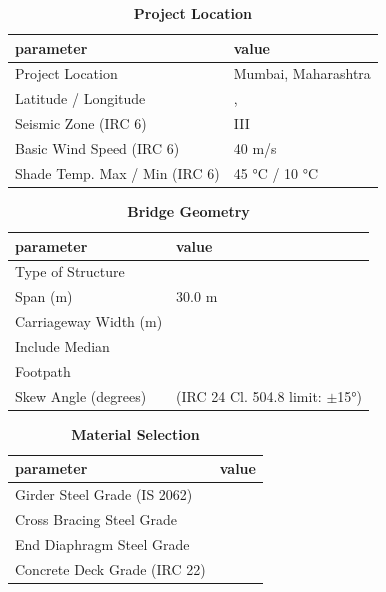 \documentclass[12pt,a4paper]{report}
\numberwithin{table}{chapter}
\numberwithin{figure}{chapter}
\begin{document}
\begin{table}[H]
\caption{\textbf{Project Location}}
\label{subsec:project-location}
\begin{tabular}{|L{5.5cm}|L{8.5cm}|}
\hline
\textbf{parameter} & \textbf{value} \\
\hline
\textnormal{Project Location} & Mumbai, Maharashtra \\
\hline
\textnormal{Latitude / Longitude} & ,  \\
\hline
\textnormal{Seismic Zone (IRC 6)} & III \\
\hline
\textnormal{Basic Wind Speed (IRC 6)} & 40 m/s \\
\hline
\textnormal{Shade Temp. Max / Min (IRC 6)} & 45 °C / 10 °C \\
\hline
\end{tabular}
\vspace{0.4cm}
\end{table}

\begin{table}[H]
\caption{\textbf{Bridge Geometry}}
\label{subsec:bridge-geometry}
\begin{tabular}{|L{5.5cm}|L{8.5cm}|}
\hline
\textbf{parameter} & \textbf{value} \\
\hline
\textnormal{Type of Structure} &  \\
\hline
\textnormal{Span (m)} & 30.0 m \\
\hline
\textnormal{Carriageway Width (m)} &  \\
\hline
\textnormal{Include Median} &  \\
\hline
\textnormal{Footpath} &  \\
\hline
\textnormal{Skew Angle (degrees)} &  (IRC 24 Cl. 504.8 limit: $\pm$15°) \\
\hline
\end{tabular}
\end{table}
\vspace{0.4cm}

\begin{table}[H]
\caption{\textbf{Material Selection}}
\label{subsec:material}
\begin{tabular}{|L{5.5cm}|L{8.5cm}|}
\hline
\textbf{parameter} & \textbf{value} \\
\hline
\textnormal{Girder Steel Grade (IS 2062)} &  \\
\hline
\textnormal{Cross Bracing Steel Grade} &  \\
\hline
\textnormal{End Diaphragm Steel Grade} &  \\
\hline
\textnormal{Concrete Deck Grade (IRC 22)} &  \\
\hline
\end{tabular}
\end{table}
\vspace{0.4cm}
\end{document}
